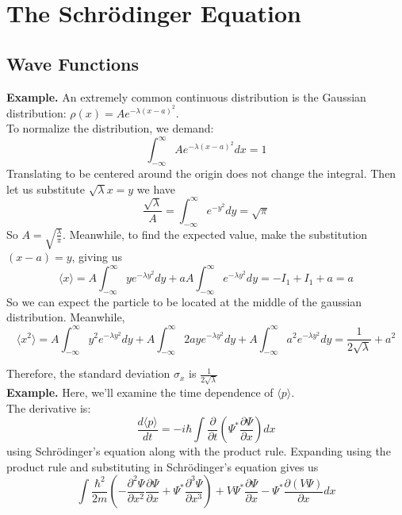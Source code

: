\documentclass[11pt]{article}
\begin{document}
\newpage
\microtoc
\newpage

\section{The Schr\"odinger Equation}
\subsection{Wave Functions}
\textbf{Example.} An extremely common continuous distribution is the Gaussian distribution:
\(\rho(x) = Ae^{-\lambda (x-a)^{2}}\). 
\\

\noindent To normalize the distribution, we demand: 
\[
    \int ^{\infty}_{-\infty} Ae^{-\lambda (x-a) ^{2}}dx = 1
\]
Translating to be centered around the origin does not change the integral. Then let us
substitute \(\sqrt{\lambda}x = y\) we have
\[
    \frac{\sqrt{\lambda}}{A} = \int^{\infty}_{-\infty} e^{-y^2}dy = \sqrt{\pi}
\]
So \(A = \sqrt{\frac{\lambda}{\pi}}\). Meanwhile, to find the expected value, make the
substitution \((x-a) = y \), giving us 
\[
    \langle x \rangle = A\int^{\infty}_{-\infty}ye^{-\lambda y^2}dy 
    + aA\int^{\infty}_{-\infty}e^{-\lambda y^2}dy =  -I_1 + I_1 + a = a   
\]
So we can expect the particle to be located at the middle of the gaussian distribution. Meanwhile, 
\[
    \langle x^2 \rangle = A\int^{\infty}_{-\infty}y^2e^{-\lambda y^2}dy 
    + A\int^{\infty}_{-\infty}2ay e^{-\lambda y^2}dy + A\int^{\infty}_{-\infty}a^2 e^{-\lambda y^2}dy = 
    \frac{1}{2\sqrt{\lambda}} + a^2
\]

\noindent Therefore, the standard deviation \(\sigma_x \) is \(\frac{1}{2\sqrt{\lambda}}\)
\\



\noindent
\textbf{Example.} Here, we'll examine the time dependence of \(\langle p \rangle\). 
\\

\noindent The derivative is:
\[
    \frac{d\langle p \rangle }{dt} = -i\hbar \int \frac{\partial}{\partial t}\left(\Psi^* \frac{\partial \Psi}{\partial x}\right)dx
\]
using Schr\"odinger's equation along with the product rule. Expanding using the product rule and substituting in 
Schr\"odinger's equation gives us 
\[
    \int \frac{\hbar^2}{2m}\left(-\frac{\partial^2 \Psi}{\partial x^2}\frac{\partial \Psi}{\partial x} 
    + \Psi^* \frac{\partial^3 \Psi}{\partial x^3} \right) + V\Psi^* \frac{\partial \Psi}{\partial x} 
    - \Psi^*\frac{\partial (V\Psi)}{\partial x}dx
\]
\end{document}
